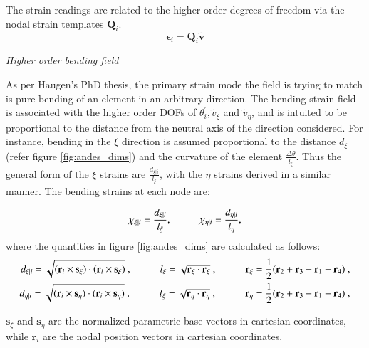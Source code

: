 The strain readings are related to the higher order degrees of freedom via the nodal strain templates $\mathbf{Q}_i$.
\begin{equation} 
\boldsymbol{\epsilon}_{i} = \mathbf{Q}_i \widetilde{\mathbf{v}}
\label{eqnAndesHigherOrderStrains}
\end{equation}

\textit{Higher order bending field}

As per Haugen's PhD thesis, the primary strain mode the field is trying to match is pure bending of an element in an arbitrary direction. The bending strain field is associated with the higher order DOFs of $\theta_i^{'}, \widetilde{v}_{\xi}$ and $\widetilde{v}_{\eta}$, and is intuited to be proportional to the distance from the neutral axis of the direction considered. For instance, bending in the $\xi$ direction is assumed proportional to the distance $d_{\xi}$ (refer figure \ref{fig:andes_dims}) and the curvature of the element $\frac{\Delta \theta}{l_{\xi}}$. Thus the general form of the $\xi$ strains are $\frac{d_{\xi | i}}{l_\xi}$, with the $\eta$ strains derived in a similar manner. The bending strains at each node are:

\begin{equation} 
\chi_{\xi | i} = \frac{d_{\xi | i}}{l_\xi},
\hspace{10mm}
\chi_{\eta | i} = \frac{d_{\eta | i}}{l_\eta},
\label{equation12}
\end{equation}
where the quantities in figure \ref{fig:andes_dims} are calculated as follows:
\begin{align*} 
	d_{\xi | i} = \sqrt{(\mathbf{r}_i \times \mathbf{s_\xi}) \cdot (\mathbf{r}_i \times \mathbf{s_\xi})}\ ,
	\hspace{10mm}
	l_\xi = \sqrt{\mathbf{r_\xi} \cdot \mathbf{r_\xi}}\ ,
	\hspace{10mm} 
	\mathbf{r_\xi} = \frac{1}{2} ( \mathbf{r}_2 + \mathbf{r}_3 - \mathbf{r}_1 - \mathbf{r}_4 )\ , \\
	d_{\eta | i} = \sqrt{(\mathbf{r}_i \times \mathbf{s_\eta}) \cdot (\mathbf{r}_i \times \mathbf{s_\eta})}\ ,
	\hspace{10mm}
	l_\xi = \sqrt{\mathbf{r_\eta} \cdot \mathbf{r_\eta}}\ ,
	\hspace{10mm}
	\mathbf{r_\eta} = \frac{1}{2} ( \mathbf{r}_2 + \mathbf{r}_3 - \mathbf{r}_1 - \mathbf{r}_4 )\ ,
\end{align*}

$\mathbf{s}_\xi$ and $\mathbf{s}_\eta$ are the normalized parametric base vectors in cartesian coordinates, while $\mathbf{r}_i$ are the nodal position vectors in cartesian coordinates.

